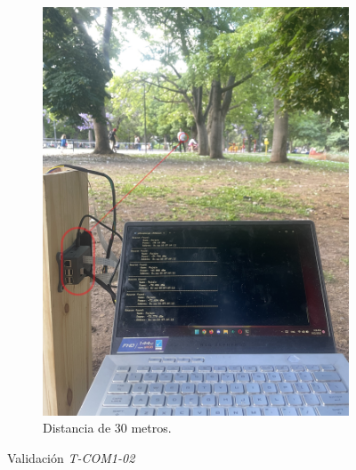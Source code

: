 \begin{figure}[H]
\begin{subfigure}{0.3\textwidth}
		\includegraphics[width=\linewidth]{ImagenesValidacion del prototipo/TINTCOM12ca}
		\caption{Distancia de 30 metros.}
	\end{subfigure}
	\caption{Validación \textit{T-COM1-02}}
\end{figure}

